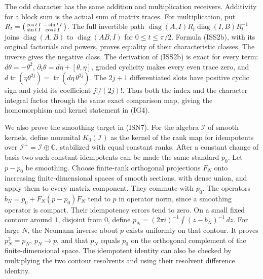 \documentclass[
  11pt,
]{article}
\begin{document}
The odd character has the same addition and multiplication receivers.
Additivity for a block sum is the actual sum of matrix traces. For
multiplication, put
\(R_t=\begin{psmallmatrix}\cos t\,I&-\sin t\,I\\\sin t\,I&\cos t\,I\end{psmallmatrix}\).
The full invertible path
\(\operatorname{diag}(A,I)R_t\operatorname{diag}(I,B)R_t^{-1}\) joins
\(\operatorname{diag}(A,B)\) to \(\operatorname{diag}(AB,I)\) for
\(0\leq t\leq\pi/2\). Formula (ISS2b), with its original factorials and
powers, proves equality of their characteristic classes. The inverse
gives the negative class. The derivation of (ISS2b) is exact for every
term: \(d\theta=-\theta^2\), \(\partial_t\theta=d\eta+[\theta,\eta]\),
graded cyclicity makes every even trace zero, and
\(d\operatorname{tr}(\eta\theta^{2j})=\operatorname{tr}(d\eta\,\theta^{2j})\).
The \(2j+1\) differentiated slots have positive cyclic sign and yield
its coefficient \(j!/(2j)!\). Thus both the index and the character
integral factor through the same exact comparison map, giving the
homomorphism and kernel statement in (IG4).

We also prove the smoothing target in (ISN7). For the algebra
\(\mathcal I\) of smooth kernels, define nonunital \(K_0(\mathcal I)\)
as the kernel of the rank map for idempotents over
\(\mathcal I^+=\mathcal I\oplus\mathbb C\), stabilized with equal
constant ranks. After a constant change of basis two such constant
idempotents can be made the same standard \(p_0\). Let \(p-p_0\) be
smoothing. Choose finite-rank orthogonal projections \(F_N\) onto
increasing finite-dimensional spaces of smooth sections, with dense
union, and apply them to every matrix component. They commute with
\(p_0\). The operators \(b_N=p_0+F_N(p-p_0)F_N\) tend to \(p\) in
operator norm, since a smoothing operator is compact. Their idempotency
errors tend to zero. On a small fixed contour around \(1\), disjoint
from \(0\), define \(p_N=(2\pi i)^{-1}\int(z-b_N)^{-1}\,dz\). For large
\(N\), the Neumann inverse about \(p\) exists uniformly on that contour.
It proves \(p_N^2=p_N\), \(p_N\to p\), and that \(p_N\) equals \(p_0\)
on the orthogonal complement of the finite-dimensional space. The
idempotent identity can also be checked by multiplying the two contour
resolvents and using their resolvent difference identity.
\end{document}
